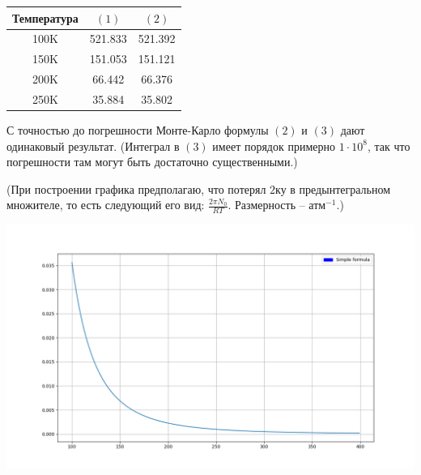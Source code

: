 \documentclass[14pt]{article}
\begin{document}
\begin{center}
\begin{tabular}{ccc}
	\hline
	Температура & $(1)$ & $(2)$ \\
	\hline
	100K & 521.833 & 521.392 \\
	150K & 151.053 & 151.121 \\
	200K & 66.442 &  66.376 \\
	250K & 35.884 & 35.802 \\
	\hline
\end{tabular} 
\end{center}

\vspace{0.3cm}
С точностью до погрешности Монте-Карло формулы $(2)$ и $(3)$ дают одинаковый результат. (Интеграл в $(3)$ имеет порядок примерно $1 \cdot 10^8$, так что погрешности там могут быть достаточно существенными.)

(При построении графика предполагаю, что потерял $2$ку в предынтегральном множителе, то есть следующий его вид: $\frac{2 \pi N_0}{RT}$. Размерность -- $\textit{атм}^{-1}$.) 

\includegraphics[scale=0.5]{plot.png}

\newpage
\end{document}

